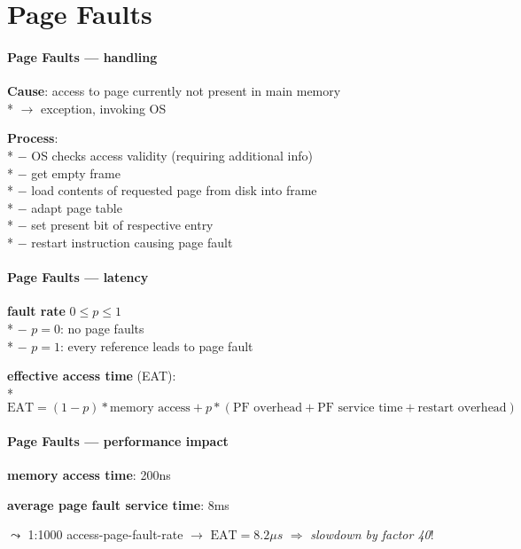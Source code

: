\section{Page Faults}

\paragraph{Page Faults --- handling}
\begin{items}
  \item \textbf{Cause}: access to page currently not present in main memory \\*
    $ \to $ exception, invoking OS
  \item \textbf{Process}: \\*
    $ - $ OS checks access validity (requiring additional info) \\*
    $ - $ get empty frame \\*
    $ - $ load contents of requested page from disk into frame \\*
    $ - $ adapt page table \\*
    $ - $ set present bit of respective entry \\*
    $ - $ restart instruction causing page fault
\end{items}

\paragraph{Page Faults --- latency}
\begin{items}
  \item \textbf{fault rate} $ 0 \leq p \leq 1 $ \\*
    $ - $ $ p = 0 $: no page faults \\*
    $ - $ $ p = 1 $: every reference leads to page fault
  \item \textbf{effective access time} (EAT): \\*
    $ \text{EAT} = (1-p)*\text{memory access} + p*(\text{PF overhead} + \text{PF service time} + \text{restart overhead}) $
\end{items}

\paragraph{Page Faults --- performance impact}
\begin{items}
  \item \textbf{memory access time}: 200ns
  \item \textbf{average page fault service time}: 8ms
  \item $ \leadsto $ 1:1000 access-page-fault-rate $ \to $ $ \text{EAT} = 8.2\mu s $ $ \Rightarrow $ \emph{slowdown by factor 40}!
\end{items}

